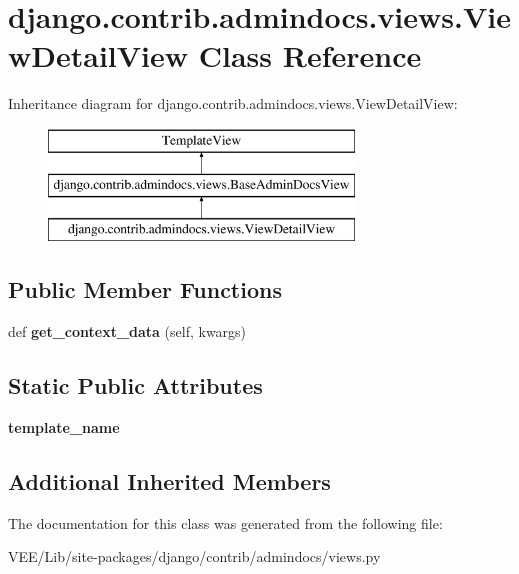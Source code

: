 \hypertarget{classdjango_1_1contrib_1_1admindocs_1_1views_1_1_view_detail_view}{}\section{django.\+contrib.\+admindocs.\+views.\+View\+Detail\+View Class Reference}
\label{classdjango_1_1contrib_1_1admindocs_1_1views_1_1_view_detail_view}
Inheritance diagram for django.\+contrib.\+admindocs.\+views.\+View\+Detail\+View\+:\begin{figure}[H]
\begin{center}
\leavevmode
\includegraphics[height=3.000000cm]{classdjango_1_1contrib_1_1admindocs_1_1views_1_1_view_detail_view}
\end{center}
\end{figure}
\subsection*{Public Member Functions}
\begin{DoxyCompactItemize}
\item 
\mbox{\label{classdjango_1_1contrib_1_1admindocs_1_1views_1_1_view_detail_view_ad0d99ea033dda7ffdf3aad3adf455866}} 
def {\bfseries get\+\_\+context\+\_\+data} (self, kwargs)
\end{DoxyCompactItemize}
\subsection*{Static Public Attributes}
\begin{DoxyCompactItemize}
\item 
\mbox{\label{classdjango_1_1contrib_1_1admindocs_1_1views_1_1_view_detail_view_a1a681da5b649cb04220faae9894a4622}} 
{\bfseries template\+\_\+name}
\end{DoxyCompactItemize}
\subsection*{Additional Inherited Members}


The documentation for this class was generated from the following file\+:\begin{DoxyCompactItemize}
\item 
V\+E\+E/\+Lib/site-\/packages/django/contrib/admindocs/views.\+py\end{DoxyCompactItemize}
